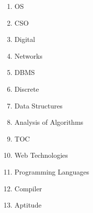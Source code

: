 \begin{enumerate}
    \item OS
    \item CSO
    \item Digital
    \item Networks
    \item DBMS
    \item Discrete
    \item Data Structures
    \item Analysis of Algorithms
    \item TOC
    \item Web Technologies
    \item Programming Languages
    \item Compiler
    \item Aptitude

\end{enumerate}
